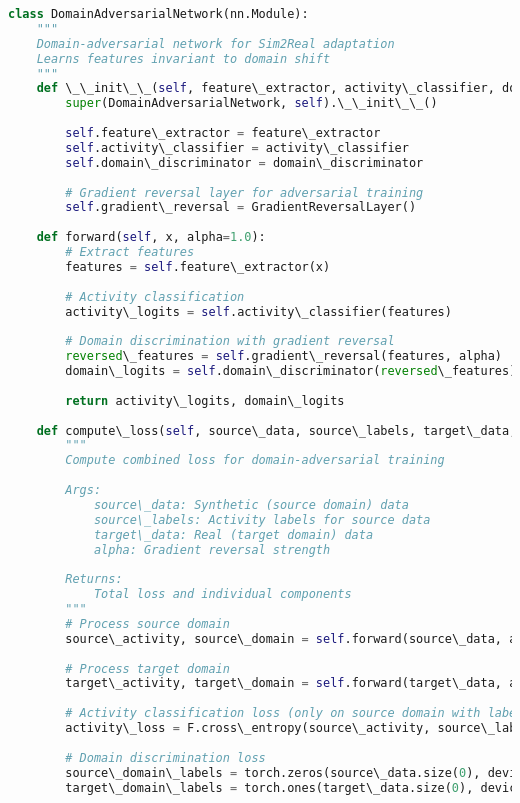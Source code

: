 \documentclass[journal]{IEEEtran}
\begin{document}
\begin{lstlisting}[language=Python, caption=Domain-Adversarial Training Framework]
class DomainAdversarialNetwork(nn.Module):
    """
    Domain-adversarial network for Sim2Real adaptation
    Learns features invariant to domain shift
    """
    def \_\_init\_\_(self, feature\_extractor, activity\_classifier, domain\_discriminator):
        super(DomainAdversarialNetwork, self).\_\_init\_\_()
        
        self.feature\_extractor = feature\_extractor
        self.activity\_classifier = activity\_classifier
        self.domain\_discriminator = domain\_discriminator
        
        # Gradient reversal layer for adversarial training
        self.gradient\_reversal = GradientReversalLayer()
        
    def forward(self, x, alpha=1.0):
        # Extract features
        features = self.feature\_extractor(x)
        
        # Activity classification
        activity\_logits = self.activity\_classifier(features)
        
        # Domain discrimination with gradient reversal
        reversed\_features = self.gradient\_reversal(features, alpha)
        domain\_logits = self.domain\_discriminator(reversed\_features)
        
        return activity\_logits, domain\_logits
    
    def compute\_loss(self, source\_data, source\_labels, target\_data, alpha=1.0):
        """
        Compute combined loss for domain-adversarial training
        
        Args:
            source\_data: Synthetic (source domain) data
            source\_labels: Activity labels for source data
            target\_data: Real (target domain) data
            alpha: Gradient reversal strength
        
        Returns:
            Total loss and individual components
        """
        # Process source domain
        source\_activity, source\_domain = self.forward(source\_data, alpha)
        
        # Process target domain
        target\_activity, target\_domain = self.forward(target\_data, alpha)
        
        # Activity classification loss (only on source domain with labels)
        activity\_loss = F.cross\_entropy(source\_activity, source\_labels)
        
        # Domain discrimination loss
        source\_domain\_labels = torch.zeros(source\_data.size(0), device=source\_data.device)
        target\_domain\_labels = torch.ones(target\_data.size(0), device=target\_data.device)
        

\end{lstlisting}
\end{document}
